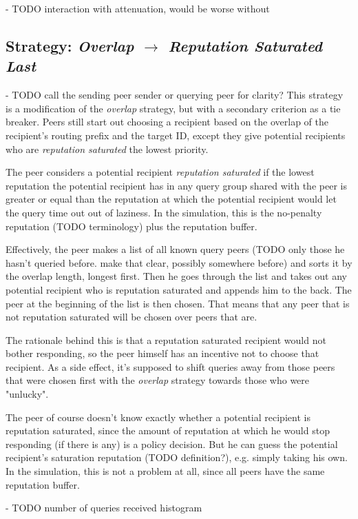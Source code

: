 - TODO interaction with attenuation, would be worse without

\subsection{Strategy: \emph{Overlap $\rightarrow$ Reputation Saturated Last}}
- TODO call the sending peer sender or querying peer for clarity?
This strategy is a modification of the \emph{overlap} strategy, but with a
secondary criterion as a tie breaker. Peers still start out choosing a recipient
based on the overlap of the recipient's routing prefix and the target ID, except
they give potential recipients who are \emph{reputation saturated} the lowest
priority.

The peer considers a potential recipient \emph{reputation saturated} if the
lowest reputation the potential recipient has in any query group shared with the
peer is greater or equal than the reputation at which the potential recipient
would let the query time out out of laziness. In the simulation, this is the
no-penalty reputation (TODO terminology) plus the reputation buffer.

Effectively, the peer makes a list of all known query peers (TODO only those he
hasn't queried before. make that clear, possibly somewhere before) and sorts it
by the overlap length, longest first. Then he goes through the list and takes
out any potential recipient who is reputation saturated and appends him to the
back. The peer at the beginning of the list is then chosen. That means that any
peer that is not reputation saturated will be chosen over peers that are.

The rationale behind this is that a reputation saturated recipient would not
bother responding, so the peer himself has an incentive not to choose that
recipient. As a side effect, it's supposed to shift queries away from those
peers that were chosen first with the \emph{overlap} strategy towards those who
were "unlucky".

The peer of course doesn't know exactly whether a potential recipient is
reputation saturated, since the amount of reputation at which he would stop
responding (if there is any) is a policy decision. But he can guess the
potential recipient's saturation reputation (TODO definition?), e.g. simply
taking his own. In the simulation, this is not a problem at all, since all peers
have the same reputation buffer.

- TODO number of queries received histogram

